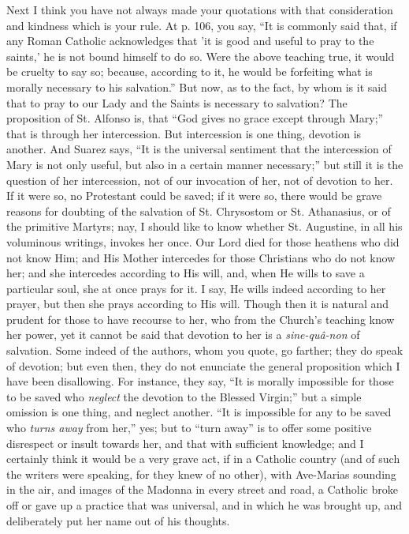 Next I think you have not always made your quotations with that
consideration and kindness which is your rule. At p. 106, you say,
``It is commonly said that, if any Roman Catholic acknowledges that
'it is good and useful to pray to the saints,' he is not bound himself
to do so. Were the above teaching true, it would be cruelty to say so;
because, according to it, he would be forfeiting what is morally
necessary to his salvation.'' But now, as to the fact, by whom is it
said that to pray to our Lady and the Saints is necessary to salvation?
The proposition of St. Alfonso is, that ``God gives no grace except
through Mary;'' that is through her intercession. But intercession
is one thing, devotion is another. And Suarez says, ``It is the
universal sentiment that the intercession of Mary is not only useful,
but also in a certain manner necessary;'' but still it is the
question of her intercession, not of our invocation of her, not of
devotion to her. If it were so, no Protestant could be saved; if it were
so, there would be grave reasons for doubting of the salvation of St.
Chrysostom or St. Athanasius, or of the primitive Martyrs; nay, I should
like to know whether St. Augustine, in all his voluminous writings,
invokes her once. Our Lord died for those heathens who did not know Him;
and His Mother intercedes for those Christians who do not know her; and
she intercedes according to His will, and, when He wills to save a
particular soul, she at once prays for it. I say, He wills indeed
according to her prayer, but then she prays according to His will.
Though then it is natural and prudent for those to have recourse to her,
who from the Church's teaching know her power, yet it cannot be said
that devotion to her is a \emph{sine-quâ-non} of salvation. Some indeed
of the authors, whom you quote, go farther; they do speak of devotion;
but even then, they do not enunciate the general proposition which I
have been disallowing. For instance, they say, ``It is morally
impossible for those to be saved who \emph{neglect} the devotion to the
Blessed Virgin;'' but a simple omission is one thing, and neglect
another. ``It is impossible for any to be saved who \emph{turns away}
from her,'' yes; but to ``turn away'' is to offer some
positive disrespect or insult towards her, and that with sufficient
knowledge; and I certainly think it would be a very grave act, if in a
Catholic country (and of such the writers were speaking, for they knew
of no other), with Ave-Marias sounding in the air, and images of the
Madonna in every street and road, a Catholic broke off or gave up a
practice that was universal, and in which he was brought up, and
deliberately put her name out of his thoughts.

